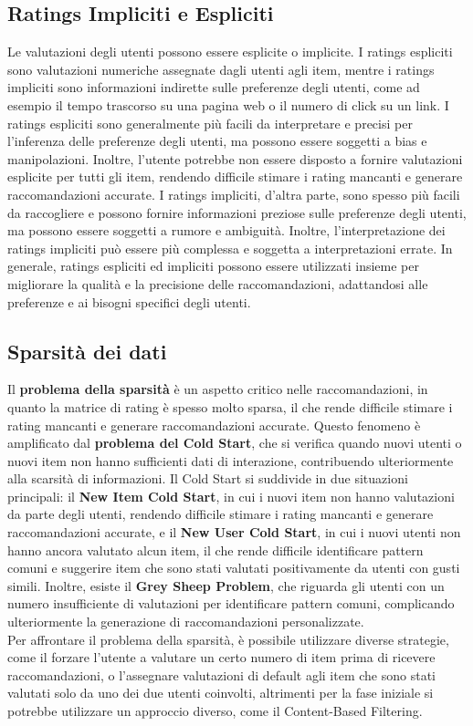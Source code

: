 \documentclass{report}
\begin{document}
	\subsection{Ratings Impliciti e Espliciti}
	Le valutazioni degli utenti possono essere esplicite o implicite. I ratings espliciti sono valutazioni numeriche assegnate dagli utenti agli item, mentre i ratings impliciti sono informazioni indirette sulle preferenze degli utenti, come ad esempio il tempo trascorso su una pagina web o il numero di click su un link. I ratings espliciti sono generalmente più facili da interpretare e precisi per l'inferenza delle preferenze degli utenti, ma possono essere soggetti a bias e manipolazioni. Inoltre, l'utente potrebbe non essere disposto a fornire valutazioni esplicite per tutti gli item, rendendo difficile stimare i rating mancanti e generare raccomandazioni accurate. I ratings impliciti, d'altra parte, sono spesso più facili da raccogliere e possono fornire informazioni preziose sulle preferenze degli utenti, ma possono essere soggetti a rumore e ambiguità. Inoltre, l'interpretazione dei ratings impliciti può essere più complessa e soggetta a interpretazioni errate. In generale, ratings espliciti ed impliciti possono essere utilizzati insieme per migliorare la qualità e la precisione delle raccomandazioni, adattandosi alle preferenze e ai bisogni specifici degli utenti.

	\subsection{Sparsità dei dati}
	Il \textbf{problema della sparsità} è un aspetto critico nelle raccomandazioni, in quanto la matrice di rating è spesso molto sparsa, il che rende difficile stimare i rating mancanti e generare raccomandazioni accurate. Questo fenomeno è amplificato dal \textbf{problema del Cold Start}, che si verifica quando nuovi utenti o nuovi item non hanno sufficienti dati di interazione, contribuendo ulteriormente alla scarsità di informazioni. Il Cold Start si suddivide in due situazioni principali: il \textbf{New Item Cold Start}, in cui i nuovi item non hanno valutazioni da parte degli utenti, rendendo difficile stimare i rating mancanti e generare raccomandazioni accurate, e il \textbf{New User Cold Start}, in cui i nuovi utenti non hanno ancora valutato alcun item, il che rende difficile identificare pattern comuni e suggerire item che sono stati valutati positivamente da utenti con gusti simili. Inoltre, esiste il \textbf{Grey Sheep Problem}, che riguarda gli utenti con un numero insufficiente di valutazioni per identificare pattern comuni, complicando ulteriormente la generazione di raccomandazioni personalizzate.
	\vspace{\baselineskip}\\
	Per affrontare il problema della sparsità, è possibile utilizzare diverse strategie, come il forzare l'utente a valutare un certo numero di item prima di ricevere raccomandazioni, o l'assegnare valutazioni di default agli item che sono stati valutati solo da uno dei due utenti coinvolti, altrimenti per la fase iniziale si potrebbe utilizzare un approccio diverso, come il Content-Based Filtering. 
\end{document}
